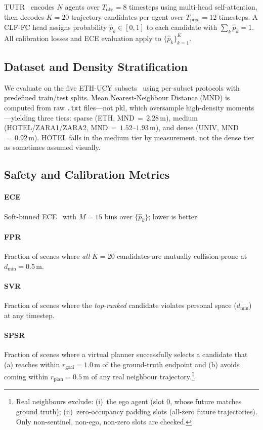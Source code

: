 \documentclass[journal,letterpaper]{IEEEtran}
\begin{document}
TUTR~\cite{shi2023tutr} encodes $N$ agents over $T_\text{obs}{=}8$
timesteps using multi-head self-attention, then decodes $K{=}20$
trajectory candidates per agent over $T_\text{pred}{=}12$ timesteps.
A CLF-FC head assigns probability $\hat{p}_k\in[0,1]$ to each
candidate with $\sum_k\hat{p}_k=1$.
All calibration losses and ECE evaluation apply to
$\{\hat{p}_k\}_{k=1}^K$.

\subsection{Dataset and Density Stratification}

We evaluate on the five ETH-UCY
subsets~\cite{pellegrini2009eth,lerner2007ucy} using per-subset
protocols with predefined train/test splits.
Mean Nearest-Neighbour Distance (MND) is computed from raw
\texttt{.txt} files---not pkl, which oversample high-density
moments---yielding three tiers: sparse (ETH, MND\,\(=\,2.28\)\,m),
medium (HOTEL/ZARA1/ZARA2, MND\,\(=\,1.52\)--\(1.93\)\,m), and
dense (UNIV, MND\,\(=\,0.92\)\,m).
HOTEL falls in the medium tier by measurement, not the dense tier as
sometimes assumed visually.

\subsection{Safety and Calibration Metrics}

\paragraph{ECE} Soft-binned ECE~\cite{karandikar2021soft} with
$M{=}15$ bins over $\{\hat{p}_k\}$; lower is better.

\paragraph{FPR} Fraction of scenes where \emph{all} $K{=}20$
candidates are mutually collision-prone at $d_\text{min}{=}0.5$\,m.

\paragraph{SVR} Fraction of scenes where the \emph{top-ranked}
candidate violates personal space ($d_\text{min}$) at any timestep.

\paragraph{SPSR} Fraction of scenes where a virtual planner
successfully selects a candidate that (a) reaches within
$r_\text{goal}{=}1.0$\,m of the ground-truth endpoint and (b) avoids
coming within $r_\text{plan}{=}0.5$\,m of any real neighbour
trajectory.\footnote{Real neighbours exclude: (i)~the ego agent (slot
0, whose future matches ground truth); (ii)~zero-occupancy padding
slots (all-zero future trajectories). Only non-sentinel, non-ego,
non-zero slots are checked.}
\end{document}
